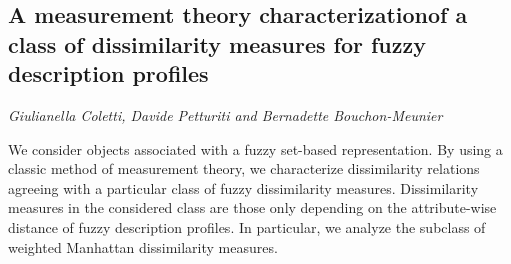 \documentclass[../booklet.tex]{subfiles}
\begin{document}
\subsection[A measurement theory characterizationof a class of dissimilarity measures for fuzzy description profiles. {\it Giulianella Coletti, Davide Petturiti and Bernadette Bouchon-Meunier}]{A measurement theory characterizationof a class of dissimilarity measures for fuzzy description profiles}
  

\begin{center}
  {\it Giulianella Coletti, Davide Petturiti and Bernadette Bouchon-Meunier}
\end{center}

\vskip 0.8cm



We consider objects associated with a fuzzy set-based
representation. By using a classic method of measurement
theory, we characterize dissimilarity relations agreeing with a particular class of fuzzy dissimilarity
measures. Dissimilarity measures in the considered class are those only depending on the attribute-wise distance of fuzzy description profiles. In particular, we analyze the subclass of weighted Manhattan dissimilarity measures.

\end{document}
